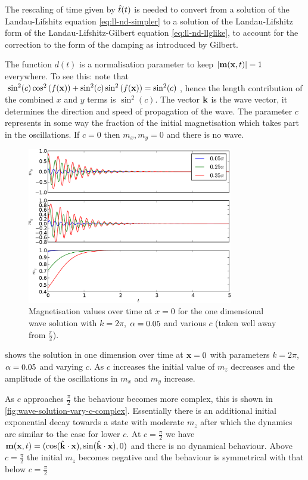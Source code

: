 The rescaling of time given by $\hat{t}(t)$ is needed to convert from a solution of the Landau-Lifshitz equation \cref{eq:ll-nd-simpler} to a solution of the Landau-Lifshitz form of the Landau-Lifshitz-Gilbert equation \cref{eq:ll-nd-llglike}, \ie to account for the correction to the form of the damping as introduced by Gilbert.

The function $d(t)$ is a normalisation parameter to keep $\left|{\boldsymbol{\mathrm{m}}(\boldsymbol{\mathrm{x}}, t)} \right| = 1$ everywhere.
To see this: note that $\sin^2(c) \cos^2{\left( f(\boldsymbol{\mathrm{x}}) \right)} + \sin^2(c) \sin^2{\left( f(\boldsymbol{\mathrm{x}}) \right)} = \sin^2(c)$, hence the length contribution of the combined $x$ and $y$ terms is $\sin^2(c)$.
The vector $\boldsymbol{\mathrm{k}}$ is the wave vector, it determines the direction and speed of propagation of the wave.
The parameter $c$ represents in some way the fraction of the initial magnetisation which takes part in the oscillations.
If $c = 0$ then $m_x, m_y = 0$ and there is no wave.

\begin{figure}
  \centering
  \includegraphics[width=0.8\textwidth]{plots/wave_exact_solution_parameters/exact_solution_parameters.pdf}
  \caption{Magnetisation values over time at $x=0$ for the one dimensional wave solution with $k = 2\pi$, $\alpha = 0.05$ and various $c$ (taken well away from $\frac{\pi}{2}$).}
  \label{fig:wave-solution-vary-c}
\end{figure}

 shows the solution in one dimension over time at $\boldsymbol{\mathrm{x}} = 0$ with parameters $k = 2\pi$, $\alpha = 0.05$ and varying $c$.
As $c$ increases the initial value of $m_z$ decreases and the amplitude of the oscillations in $m_x$ and $m_y$ increase.

As $c$ approaches $\frac{\pi}{2}$ the behaviour becomes more complex, this is shown in \cref{fig:wave-solution-vary-c-complex}.
Essentially there is an additional initial exponential decay towards a state with moderate $m_z$ after which the dynamics are similar to the case for lower $c$.
At $c=\frac{\pi}{2}$ we have $\boldsymbol{\mathrm{m}}(\boldsymbol{\mathrm{x}}, t)= (\cos({\hat{\mathbf{k}}}\cdot\boldsymbol{\mathrm{x}}), \sin({\hat{\mathbf{k}}}\cdot\boldsymbol{\mathrm{x}}), 0)$ and there is no dynamical behaviour.
Above $c=\frac{\pi}{2}$ the initial $m_z$ becomes negative and the behaviour is symmetrical with that below $c=\frac{\pi}{2}$


